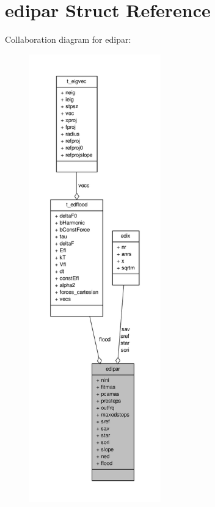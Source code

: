 \hypertarget{structedipar}{\section{edipar \-Struct \-Reference}
\label{structedipar}
}


\-Collaboration diagram for edipar\-:
\nopagebreak
\begin{figure}[H]
\begin{center}
\leavevmode
\includegraphics[height=550pt]{structedipar__coll__graph}
\end{center}
\end{figure}
